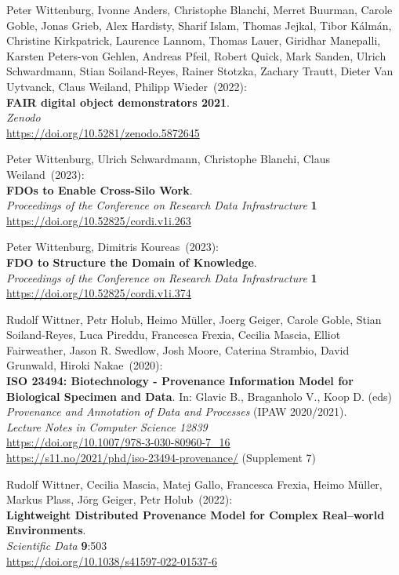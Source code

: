 \begin{thebibliography}{9}
Peter Wittenburg, Ivonne Anders, Christophe Blanchi, Merret Buurman, Carole Goble, Jonas Grieb, Alex Hardisty, Sharif Islam, Thomas Jejkal, Tibor Kálmán, Christine Kirkpatrick, Laurence Lannom, Thomas Lauer, Giridhar Manepalli, Karsten Peters-von Gehlen, Andreas Pfeil, Robert Quick, Mark Sanden, Ulrich Schwardmann, Stian Soiland-Reyes, Rainer Stotzka, Zachary Trautt, Dieter Van Uytvanck, Claus Weiland, Philipp Wieder~(2022): \\
\textbf{FAIR digital object demonstrators 2021}.\\
\emph{Zenodo}\\
\url{https://doi.org/10.5281/zenodo.5872645}

Peter Wittenburg, Ulrich Schwardmann, Christophe Blanchi, Claus Weiland~(2023): \\
\textbf{FDOs to Enable Cross-Silo Work}.\\
\emph{Proceedings of the Conference on Research Data Infrastructure}
\textbf{1} \\
\url{https://doi.org/10.52825/cordi.v1i.263}

Peter Wittenburg, Dimitris Koureas~(2023): \\
\textbf{FDO to Structure the Domain of Knowledge}.\\
\emph{Proceedings of the Conference on Research Data Infrastructure}
\textbf{1} \\
\url{https://doi.org/10.52825/cordi.v1i.374}

Rudolf Wittner, Petr Holub, Heimo Müller, Joerg Geiger, Carole Goble, Stian Soiland-Reyes, Luca Pireddu, Francesca Frexia, Cecilia Mascia, Elliot Fairweather, Jason R. Swedlow, Josh Moore, Caterina Strambio, David Grunwald, Hiroki Nakae~(2020): \\
\textbf{ISO 23494: Biotechnology - Provenance Information Model for Biological Specimen and Data}.
In: Glavic B., Braganholo V., Koop D. (eds) 
\emph{Provenance and Annotation of Data and Processes} (IPAW 2020/2021).\\
\emph{Lecture Notes in Computer Science 12839}\\
\url{https://doi.org/10.1007/978-3-030-80960-7_16} \\
\url{https://s11.no/2021/phd/iso-23494-provenance/}
(Supplement 7)

Rudolf Wittner, Cecilia Mascia, Matej Gallo, Francesca Frexia, Heimo Müller, Markus Plass, Jörg Geiger, Petr Holub~(2022): \\
\textbf{Lightweight Distributed Provenance Model for Complex Real--world Environments}.\\
\emph{Scientific Data} \textbf{9}:503 \\
\url{https://doi.org/10.1038/s41597-022-01537-6}


\end{thebibliography}
